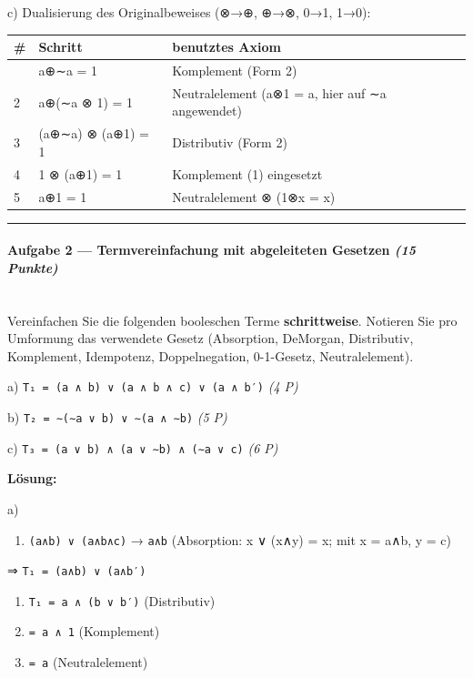 \documentclass[11pt, a4paper]{article}
\begin{document}
c) Dualisierung des Originalbeweises (⊗→⊕, ⊕→⊗, 0→1, 1→0):



{\small
\begin{tabularx}{\linewidth}{XXX}
\hline
\rowcolor{tableheadbg}
{\color{white}\textbf{\#}} & {\color{white}\textbf{Schritt}} & {\color{white}\textbf{benutztes Axiom}} \\[2pt]
\hline
\endhead
\hline
\endfoot
1 & a⊕∼a = 1 & Komplement (Form 2) \\
2 & a⊕(∼a ⊗ 1) = 1 & Neutralelement (a⊗1 = a, hier auf ∼a angewendet) \\
3 & (a⊕∼a) ⊗ (a⊕1) = 1 & Distributiv (Form 2) \\
4 & 1 ⊗ (a⊕1) = 1 & Komplement (1) eingesetzt \\
5 & a⊕1 = 1 & Neutralelement ⊗ (1⊗x = x) \\
\end{tabularx}
}



\noindent\textcolor{rulegray}{\rule{\linewidth}{0.4pt}}


\paragraph{Aufgabe 2 — Termvereinfachung mit abgeleiteten Gesetzen \textit{(15 Punkte)}}\mbox{}\\[2pt]

Vereinfachen Sie die folgenden booleschen Terme \textbf{schrittweise}. Notieren Sie pro Umformung das verwendete Gesetz (Absorption, DeMorgan, Distributiv, Komplement, Idempotenz, Doppelnegation, 0-1-Gesetz, Neutralelement).


a) \texttt{T₁ = (a ∧ b) ∨ (a ∧ b ∧ c) ∨ (a ∧ b′)} \textit{(4 P)}


b) \texttt{T₂ = ∼(∼a ∨ b) ∨ ∼(a ∧ ∼b)} \textit{(5 P)}


c) \texttt{T₃ = (a ∨ b) ∧ (a ∨ ∼b) ∧ (∼a ∨ c)} \textit{(6 P)}


\textbf{Lösung:}


a)

\begin{enumerate}
  \item \texttt{(a∧b) ∨ (a∧b∧c)} → \texttt{a∧b} (Absorption: x ∨ (x∧y) = x; mit x = a∧b, y = c)
\end{enumerate}
⇒ \texttt{T₁ = (a∧b) ∨ (a∧b′)}

\begin{enumerate}
  \item \texttt{T₁ = a ∧ (b ∨ b′)} (Distributiv)
  \item \texttt{= a ∧ 1} (Komplement)
  \item \texttt{= a} (Neutralelement)
\end{enumerate}
\end{document}

